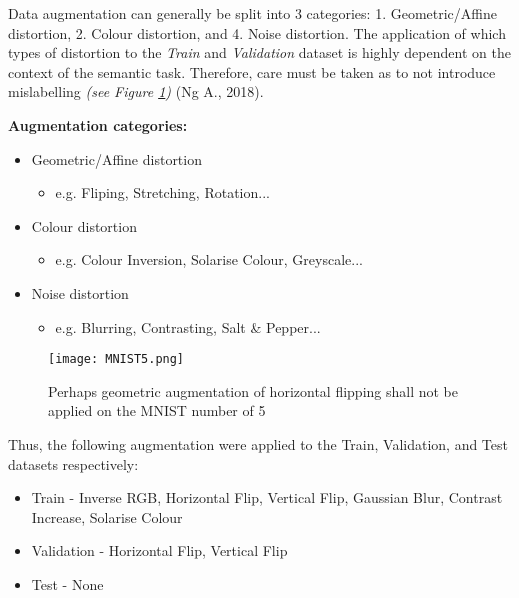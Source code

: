 \documentclass[11pt, a4paper, twoside]{report}
\begin{document}
Data augmentation can generally be split into 3 categories: 1. Geometric/Affine distortion, 2. Colour distortion, and 4. Noise distortion. The application of which types of distortion to the \textit{Train} and \textit{Validation} dataset is highly dependent on the context of the semantic task. Therefore, care must be taken as to not introduce mislabelling \textit{(see Figure \ref{fig:MNIST5})} (Ng A., 2018).\\\par
\textbf{Augmentation categories:}

\begin{itemize}
  \item Geometric/Affine distortion
    \begin{itemize}
      \item e.g. Fliping, Stretching, Rotation...
    \end{itemize}
\end{itemize}
\begin{itemize}
  \item Colour distortion
    \begin{itemize}
      \item e.g. Colour Inversion, Solarise Colour, Greyscale...
    \end{itemize}
\end{itemize}
\begin{itemize}
  \item Noise distortion
    \begin{itemize}
      \item e.g. Blurring, Contrasting, Salt \& Pepper...
    \end{itemize}
\end{itemize}


\begin{figure}[H]
  \centering
  \texttt{[image: MNIST5.png]}
  \caption{Perhaps geometric augmentation of horizontal flipping shall not be applied on the MNIST number of 5}
  \label{fig:MNIST5}
\end{figure}

Thus, the following augmentation were applied to the Train, Validation, and Test datasets respectively:\\\par

\begin{itemize}
  \item Train - Inverse RGB, Horizontal Flip, Vertical Flip, Gaussian Blur, Contrast Increase, Solarise Colour
  \item Validation - Horizontal Flip, Vertical Flip
  \item Test - None
\end{itemize}
\end{document}
